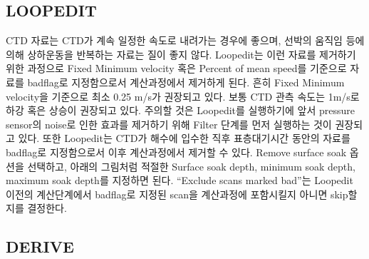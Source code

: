 \documentclass[
]{book}
\begin{document}
\hypertarget{loopedit}{%
\subsection{LOOPEDIT}\label{loopedit}}

CTD 자료는 CTD가 계속 일정한 속도로 내려가는 경우에 좋으며, 선박의 움직임 등에 의해 상하운동을 반복하는 자료는 질이 좋지 않다. Loopedit는 이런 자료를 제거하기 위한 과정으로 Fixed Minimum velocity 혹은 Percent of mean speed를 기준으로 자료를 badflag로 지정함으로서 계산과정에서 제거하게 된다. 흔히 Fixed Minimum velocity을 기준으로 최소 0.25 m/s가 권장되고 있다. 보통 CTD 관측 속도는 1m/s로 하강 혹은 상승이 권장되고 있다. 주의할 것은 Loopedit를 실행하기에 앞서 pressure sensor의 noise로 인한 효과를 제거하기 위해 Filter 단계를 먼저 실행하는 것이 권장되고 있다.
또한 Loopedit는 CTD가 해수에 입수한 직후 표층대기시간 동안의 자료를 badflag로 지정함으로서 이후 계산과정에서 제거할 수 있다. Remove surface soak 옵션을 선택하고, 아래의 그림처럼 적절한 Surface soak depth, minimum soak depth, maximum soak depth를 지정하면 된다. ``Exclude scans marked bad''는 Loopedit 이전의 계산단계에서 badflag로 지정된 scan을 계산과정에 포함시킬지 아니면 skip할지를 결정한다.

\hypertarget{derive}{%
\subsection{DERIVE}\label{derive}}
\end{document}
